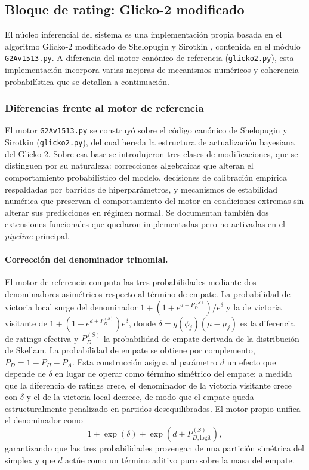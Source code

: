 \subsection{Bloque de rating: Glicko-2 modificado}
\label{subsec:rating}

El n\'ucleo inferencial del sistema es una implementaci\'on propia basada en el algoritmo Glicko-2 modificado de Shelopugin y Sirotkin \cite{Glicko2Mod}, contenida en el m\'odulo \texttt{G2Av1513.py}. A diferencia del motor can\'onico de referencia (\texttt{glicko2.py}), esta implementaci\'on incorpora varias mejoras de mecanismos num\'ericos y coherencia probabil\'istica que se detallan a continuaci\'on.

\subsubsection{Diferencias frente al motor de referencia}
\label{subsubsec:mejoras_g2av1513}

El motor \texttt{G2Av1513.py} se construy\'o sobre el c\'odigo can\'onico de Shelopugin y Sirotkin (\texttt{glicko2.py}), del cual hereda la estructura de actualizaci\'on bayesiana del Glicko-2. Sobre esa base se introdujeron tres clases de modificaciones, que se distinguen por su naturaleza: correcciones algebraicas que alteran el comportamiento probabil\'istico del modelo, decisiones de calibraci\'on emp\'irica respaldadas por barridos de hiperpar\'ametros, y mecanismos de estabilidad num\'erica que preservan el comportamiento del motor en condiciones extremas sin alterar sus predicciones en r\'egimen normal. Se documentan tambi\'en dos extensiones funcionales que quedaron implementadas pero no activadas en el \textit{pipeline} principal.

\paragraph{Correcci\'on del denominador trinomial.} El motor de referencia computa las tres probabilidades mediante dos denominadores asim\'etricos respecto al t\'ermino de empate. La probabilidad de victoria local surge del denominador $1 + (1 + e^{d+P_D^{(S)}})/e^{\delta}$ y la de victoria visitante de $1 + (1 + e^{d+P_D^{(S)}})e^{\delta}$, donde $\delta = g(\phi_j)(\mu - \mu_j)$ es la diferencia de ratings efectiva y $P_D^{(S)}$ la probabilidad de empate derivada de la distribuci\'on de Skellam. La probabilidad de empate se obtiene por complemento, $P_D = 1 - P_H - P_A$. Esta construcci\'on asigna al par\'ametro $d$ un efecto que depende de $\delta$ en lugar de operar como t\'ermino sim\'etrico del empate: a medida que la diferencia de ratings crece, el denominador de la victoria visitante crece con $\delta$ y el de la victoria local decrece, de modo que el empate queda estructuralmente penalizado en partidos desequilibrados. El motor propio unifica el denominador como
\begin{equation}
	1 + \exp(\delta) + \exp(d + P_{D,\text{logit}}^{(S)}),
\end{equation}
garantizando que las tres probabilidades provengan de una partici\'on sim\'etrica del simplex y que $d$ act\'ue como un t\'ermino aditivo puro sobre la masa del empate.

